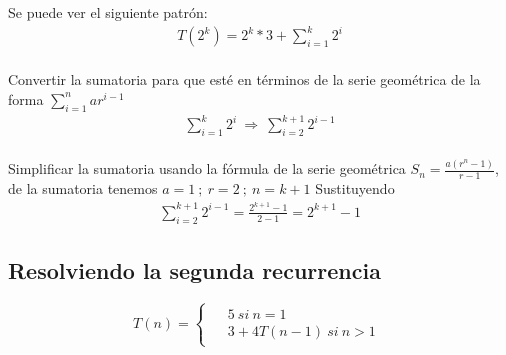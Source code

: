 \documentclass[11pt,letterpaper,fleqn]{article}
\begin{document}
Se puede ver el siguiente patrón:
\begin{equation*}
	\begin{aligned}
		T(2^{k}) = 2^{k}*3 + \sum_{i=1}^{k}2^{i} \\
	\end{aligned}
\end{equation*}

Convertir la sumatoria para que esté en términos de la serie geométrica de la forma $\displaystyle \sum_{i=1}^{n}ar^{i-1}$
\begin{equation*}
	\begin{aligned}
		\sum_{i=1}^{k}2^{i} \ \Rightarrow \ \sum_{i=2}^{k+1}2^{i-1} \\
	\end{aligned}
\end{equation*}

Simplificar la sumatoria usando la fórmula de la serie geométrica $S_{n} = \frac{a(r^{n}-1)}{r-1}$, de la sumatoria tenemos $a = 1 \ ; \ r=2 \ ; \ n =k+1$ \smallbreak
Sustituyendo
\begin{equation*}
	\begin{aligned}
		\sum_{i=2}^{k+1}2^{i-1} = \frac{2^{k+1}-1}{2-1} = 2^{k+1}-1
	\end{aligned}
\end{equation*}

\newpage
\subsection{Resolviendo la segunda recurrencia}
\begin{equation*}
	T(n) =
	\begin{cases}
		\begin{aligned}
			&5 \ si \ n = 1\\
			&3 + 4T(n-1) \ si \ n > 1
		\end{aligned}
	\end{cases}
\end{equation*}
\end{document}
